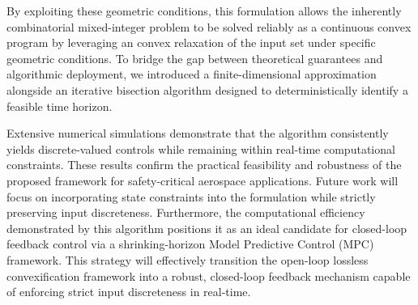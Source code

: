 \documentclass[conf]{new-aiaa}
\begin{document}
By exploiting these geometric conditions, this formulation allows the inherently combinatorial mixed-integer problem to be solved reliably as a continuous convex program by leveraging an convex relaxation of the input set under specific geometric conditions. To bridge the gap between theoretical guarantees and algorithmic deployment, we introduced a finite-dimensional approximation alongside an iterative bisection algorithm designed to deterministically identify a feasible time horizon.

Extensive numerical simulations demonstrate that the algorithm consistently yields discrete-valued controls while remaining within real-time computational constraints. These results confirm the practical feasibility and robustness of the proposed framework for safety-critical aerospace applications. Future work will focus on incorporating state constraints into the formulation while strictly preserving input discreteness. Furthermore, the computational efficiency demonstrated by this algorithm positions it as an ideal candidate for closed-loop feedback control via a shrinking-horizon Model Predictive Control (MPC) framework. This strategy will effectively transition the open-loop lossless convexification framework into a robust, closed-loop feedback mechanism capable of enforcing strict input discreteness in real-time.


\end{document}
